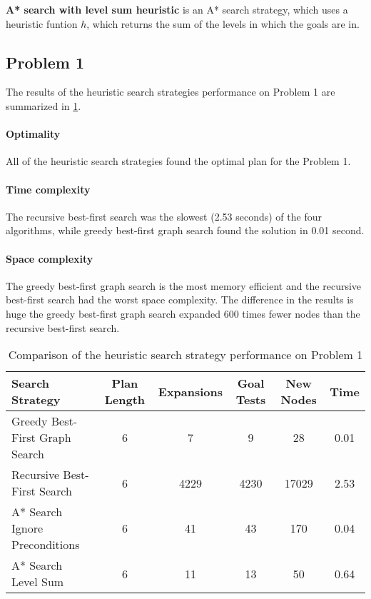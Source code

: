 \documentclass[11pt]{article}
\begin{document}
\textbf{A* search with level sum heuristic} is an A* search strategy, which uses a heuristic funtion $h$, which returns the sum of the levels in which the goals are in.

\subsection{Problem 1}

The results of the heuristic search strategies performance on Problem 1 are summarized in \ref{table:hp1}.

\paragraph{Optimality}

All of the heuristic search strategies found the optimal plan for the Problem 1.

\paragraph{Time complexity}

The recursive best-first search was the slowest (2.53 seconds) of the four algorithms, while greedy best-first graph search found the solution in 0.01 second.

\paragraph{Space complexity}

The greedy best-first graph search is the most memory efficient and the recursive best-first search had the worst space complexity. The difference in the results is huge the greedy best-first graph search expanded 600 times fewer nodes than the recursive best-first search. 

\begin{table}[H]
  \centering
  \caption{Comparison of the heuristic search strategy performance on Problem 1}
  \bigskip
  \label{table:hp1}
  \bgroup
  \def\arraystretch{1.5}
  \begin{tabular}{p{3.7cm}|c|c|c|c|c}
    Search Strategy & Plan Length & Expansions & Goal Tests & New Nodes & Time \\
    \hline
    Greedy Best-First Graph Search & 6 & 7 & 9 & 28 & 0.01 \\
    Recursive Best-First Search & 6 & 4229 & 4230 & 17029 & 2.53 \\
    A* Search Ignore Preconditions & 6 & 41 & 43 & 170 & 0.04 \\
    A* Search Level Sum & 6 & 11 & 13 & 50 & 0.64 \\
  \end{tabular}
  \egroup
\end{table}
\end{document}
